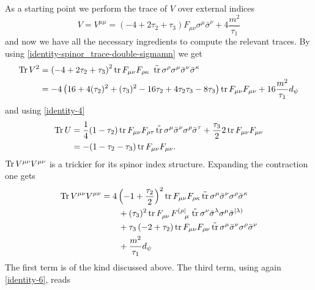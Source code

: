 As a starting point we perform the trace of $V$ over external indices
\begin{equation}
V = V^{\mu\mu}
	=
\left(-4 + 2{\tau_2} + \tau_3 \right) 
	F_{\mu\nu} \sigma^{\mu} \bar \sigma^\nu 
	+ 4 \frac{m^2}{\tau_{1}} 
\end{equation}
and now we have all the necessary ingredients to compute the relevant traces.
By using \eqref{identity-spinor_trace-double-sigmamn} we get
\begin{align}
\begin{split}
\operatorname{Tr} V^2
	& = \left(-4 + 2{\tau_2} + \tau_3 \right)^2
	\operatorname{tr} F_{\mu\nu} F_{\rho\kappa} \
	\operatorname{\tilde{tr}} \sigma^{\rho}\sigma^{\mu} \bar \sigma^\nu \bar \sigma^\kappa
\\
	& = -4 \left( 16 + 4({\tau_2})^2 + (\tau_3)^2 - 16 \tau_2 + 4 \tau_2\tau_3 -8 \tau_3 \right) \operatorname{tr} F_{\mu\nu} F_{\mu\nu}
+ 16 \frac{m^2}{\tau_{1}} d_{\psi}
\end{split}	
\end{align}
and using \eqref{identity-4}
\begin{align}
\operatorname{Tr} U 
	& = \frac{1}{4} (1 - \tau_2) \operatorname{tr} F_{\mu\nu} F_{\rho \tau} \operatorname{\tilde{tr}} \sigma^\mu \bar \sigma^\nu \sigma^\rho \bar \sigma^\tau   +
 \frac{\tau_3}{2} 2 \operatorname{tr} F_{\mu\nu} F_{\mu\nu}
\\\nonumber
& = - (1 - \tau_2 - {\tau_3}) \operatorname{tr} F_{\mu\nu} F_{\mu \nu}.
\end{align}
\(\operatorname{Tr} V^{\mu\nu} V^{\mu\nu}\) is a trickier for its spinor index structure.
Expanding the contraction one gets
\begin{equation}
\begin{split}
\Tr V^{\mu\nu}V^{\mu\nu}
&	=
4 \left(-1 + \frac{\tau_2}{2}\right)^2
\tr F_{\mu\nu} F_{\rho\kappa} \str \sigma^\mu \bar \sigma^\nu \sigma^\rho \bar \sigma^\kappa
\\
& \qquad
+ (\tau_3)^2 \tr F\indices{_{\rho\nu }} F\indices{^{(\rho|}_\mu } 
\str \sigma^\nu \bar\sigma^{\lambda} \sigma^\mu \bar\sigma^{|\lambda)}
\\
& \qquad
+ \tau_3  \left(-2 + {\tau_2} \right) 
	\tr F_{\mu\nu} F_{\rho \nu}
	\str \sigma^\mu \bar \sigma^\nu \sigma^\rho \bar \sigma ^\nu
\\
& \qquad
+ \frac{m^2}{\tau_{1}} d_{\psi}
\end{split}
\end{equation}
The first term is of the kind discussed above.
The third term, using again \eqref{identity-6}, reads
